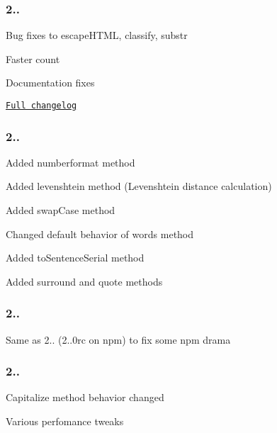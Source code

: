 \subsubsection*{2..}


\begin{DoxyItemize}
\item Bug fixes to {\ttfamily escape\+H\+T\+ML}, {\ttfamily classify}, {\ttfamily substr}
\item Faster {\ttfamily count}
\item Documentation fixes
\item \href{https://github.com/epeli/underscore.string/compare/v2.3.0...v2.3.1}{\tt Full changelog}
\end{DoxyItemize}

\subsubsection*{2..}


\begin{DoxyItemize}
\item Added {\ttfamily numberformat} method
\item Added {\ttfamily levenshtein} method (Levenshtein distance calculation)
\item Added {\ttfamily swap\+Case} method
\item Changed default behavior of {\ttfamily words} method
\item Added {\ttfamily to\+Sentence\+Serial} method
\item Added {\ttfamily surround} and {\ttfamily quote} methods
\end{DoxyItemize}

\subsubsection*{2..}


\begin{DoxyItemize}
\item Same as 2.. (2..\+0rc on npm) to fix some npm drama
\end{DoxyItemize}

\subsubsection*{2..}


\begin{DoxyItemize}
\item Capitalize method behavior changed
\item Various perfomance tweaks
\end{DoxyItemize}

